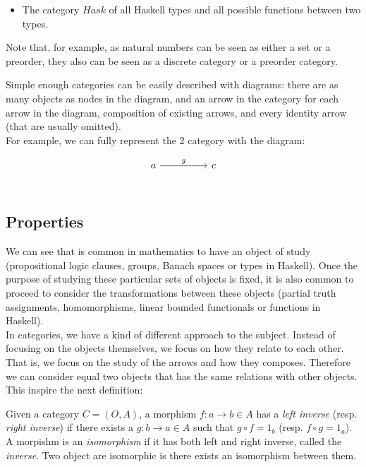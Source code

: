 \begin{example}
\begin{itemize}
\item The category $Hask$ of all Haskell types and all possible functions between two types.\\
  
\end{itemize}
Note that, for example, as natural numbers can be seen as either a set or a preorder, they also can be seen as a discrete category or a preorder category.
\end{example}


Simple enough categories can be easily described with diagrams: there are as many objects as nodes in the diagram, and an arrow in the category for each arrow in the diagram, composition of existing arrows, and every identity arrow (that are usually omitted).\\

For example, we can fully represent the $2$ category with the diagram:

    \[
      \begin{tikzcd}
        a\arrow[rr, "g"] && c\\
      \end{tikzcd}
    \]




\subsection{Properties}

We can see that is common in mathematics to have an object of study (propositional logic clauses, groups, Banach spaces or types in Haskell). Once the purpose of studying these particular sets of objects is fixed, it is also common to proceed to consider the transformations between these objects (partial truth assignments, homomorphisms, linear bounded functionals or  functions in Haskell).\\

In categories, we have a kind of different approach to the subject. Instead of focusing on the objects themselves, we focus on how they relate to each other. That is, we focus on the study of the arrows and how they composes. Therefore we can consider equal two objects that has the same relations with other objects. This inspire the next definition:

\begin{definition}\cite[Definition 1.1.9]{riehl2017category}
  Given a category $C=(O,A)$, a morphism $f: a \to b \in A$ has a \emph{left inverse} (resp. \emph{right inverse}) if there exists a $g: b \to a \in A$ such that $g \circ f = 1_b$ (resp. $f \circ g = 1_a$). A morpishm is an \emph{isomorphism} if it has both left and right inverse, called the \emph{inverse}. Two object are isomorphic is there exists an isomorphism between them.
\end{definition}


